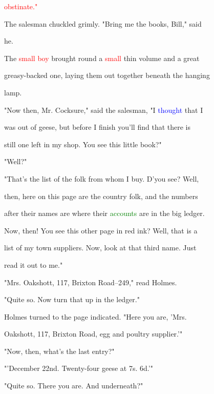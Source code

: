  \textcolor{red}{obstinate."}



 The salesman \textcolor{BurntOrange}{chuckled} grimly. "Bring me the books, Bill," said

 he.



 The \textcolor{red}{small} \textcolor{red}{boy} brought round a \textcolor{red}{small} thin volume and a great

 greasy-backed one, laying them out together beneath the hanging

 lamp.



 "Now then, Mr. Cocksure," said the salesman, "I \textcolor{blue}{thought} that I

 was out of geese, but before I finish you'll find that there is

 still one left in my shop. You see this little book?"



 "Well?"



 "That's the list of the folk from whom I buy. D'you see? Well,

 then, here on this page are the country folk, and the numbers

 after their names are where their \textcolor{green}{accounts} are in the big ledger.

 Now, then! You see this other page in red ink? Well, that is a

 list of my town suppliers. Now, look at that third name. Just

 read it out to me."



 "Mrs. Oakshott, 117, Brixton Road--249," read Holmes.



 "Quite so. Now turn that up in the ledger."



 Holmes turned to the page indicated. "Here you are, 'Mrs.

 Oakshott, 117, Brixton Road, egg and poultry supplier.'"



 "Now, then, what's the last entry?"



 "'December 22nd. Twenty-four geese at 7s. 6d.'"



 "Quite so. There you are. And underneath?"



